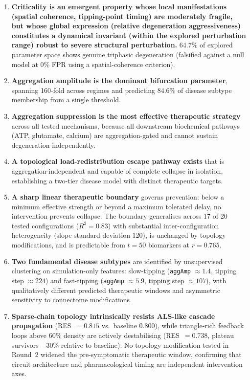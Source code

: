 \documentclass[12pt,a4paper]{article}
\begin{document}
\begin{enumerate}
\item \textbf{Criticality is an emergent property whose local manifestations (spatial coherence,
tipping-point timing) are moderately fragile, but whose global expression (relative degeneration
aggressiveness) constitutes a dynamical invariant (within the explored perturbation range) robust to severe structural perturbation.}
64.7\% of explored parameter space shows genuine triphasic degeneration (falsified against a
null model at 0\% FPR using a spatial-coherence criterion).

\item \textbf{Aggregation amplitude is the dominant bifurcation parameter}, spanning 160-fold
across regimes and predicting 84.6\% of disease subtype membership from a single threshold.

\item \textbf{Aggregation suppression is the most effective therapeutic strategy} across all
tested mechanisms, because all downstream biochemical pathways (ATP, glutamate, calcium) are
aggregation-gated and cannot sustain degeneration independently.

\item \textbf{A topological load-redistribution escape pathway exists} that is
aggregation-independent and capable of complete collapse in isolation, establishing a two-tier
disease model with distinct therapeutic targets.

\item \textbf{A sharp linear therapeutic boundary} governs prevention: below a minimum
effective strength or beyond a maximum tolerated delay, no intervention prevents collapse. The
boundary generalises across 17 of 20 tested configurations ($R^2 = 0.83$) with substantial
inter-configuration heterogeneity (slope standard deviation 120), is unchanged by topology
modifications, and is predictable from $t=50$ biomarkers at $r=0.765$.

\item \textbf{Two fundamental disease subtypes} are identified by unsupervised clustering on
simulation-only features: slow-tipping (\texttt{aggAmp} $\approx 1.4$, tipping step
$\approx 224$) and fast-tipping (\texttt{aggAmp} $\approx 5.9$, tipping step $\approx 107$),
with qualitatively different predicted therapeutic windows and asymmetric sensitivity to
connectome modifications.

\item \textbf{Sparse-chain topology intrinsically resists ALS-like cascade propagation}
(RES~$=0.815$ vs.\ baseline 0.800), while triangle-rich feedback loops above 60\% density are
actively destabilising (RES~$=0.738$, plateau survivors $-30\%$ relative to baseline). No
topology modification tested in Round~2 widened the pre-symptomatic therapeutic window,
confirming that circuit architecture and pharmacological timing are independent intervention axes.


\end{enumerate}
\end{document}

